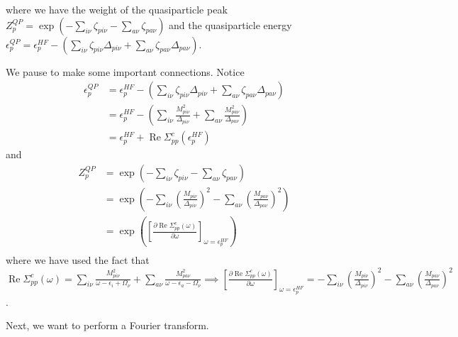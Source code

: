 where we have the weight of the quasiparticle peak $Z_p^{QP} = \exp\left(-\sum_{i\nu} \zeta_{pi\nu} - \sum_{a\nu} \zeta_{pa\nu}\right)$ and the quasiparticle energy $\epsilon_p^{QP} = \epsilon_p^{HF} - \left(\sum_{i\nu} \zeta_{pi\nu} \Delta_{pi\nu} + \sum_{a\nu} \zeta_{pa\nu} \Delta_{pa\nu}\right)$. 
\begin{tcolorbox}
We pause to make some important connections. Notice
\begin{align}
\epsilon_p^{QP} & = \epsilon_p^{HF} - \left(\sum_{i\nu} \zeta_{pi\nu} \Delta_{pi\nu} + \sum_{a\nu} \zeta_{pa\nu} \Delta_{pa\nu}\right) \\
& = \epsilon_p^{HF} - \left(\sum_{i\nu} \frac{M_{pi\nu}^2}{\Delta_{pi\nu}} + \sum_{a\nu} \frac{M_{pa\nu}^2}{\Delta_{pa\nu}}\right) \\
& = \epsilon_p^{HF} + \operatorname{Re} \Sigma_{pp}^c\left(\epsilon_p^{HF}\right)
\end{align}
and
\begin{align}
Z_p^{QP} & = \exp\left(-\sum_{i\nu} \zeta_{pi\nu} - \sum_{a\nu} \zeta_{pa\nu}\right) \\
& = \exp\left(-\sum_{i\nu} \left(\frac{M_{pi\nu}}{\Delta_{pi\nu}}\right)^2 - \sum_{a\nu} \left(\frac{M_{pa\nu}}{\Delta_{pa\nu}}\right)^2\right) \\
& = \exp\left(\left[\frac{\partial \operatorname{Re} \Sigma_{pp}^c(\omega)}{\partial \omega}\right]_{\omega = \epsilon_p^{HF}}\right) \\
\end{align}
where we have used the fact that $\operatorname{Re} \Sigma_{pp}^c(\omega) = \sum_{i\nu} \frac{M_{pi\nu}^2}{\omega - \epsilon_i + \Omega_\nu} + \sum_{a\nu} \frac{M_{pa\nu}^2}{\omega - \epsilon_a - \Omega_\nu} \implies \left[\frac{\partial \operatorname{Re} \Sigma_{pp}^c(\omega)}{\partial \omega}\right]_{\omega = \epsilon_p^{HF}} = -\sum_{i\nu} \left(\frac{M_{pi\nu}}{\Delta_{pi\nu}}\right)^2 - \sum_{a\nu} \left(\frac{M_{pa\nu}}{\Delta_{pa\nu}}\right)^2$.
\end{tcolorbox}
Next, we want to perform a Fourier transform.
